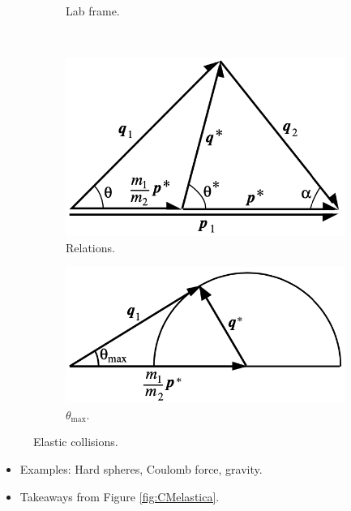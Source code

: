 \documentclass[../notes.tex]{subfiles}
\begin{document}
\begin{itemize}
\begin{figure}[h!]
\begin{subfigure}[b]{0.35\linewidth}
            \caption{Lab frame.}
            \label{fig:CMelasticb}
        \end{subfigure}\\[1em]
        \begin{subfigure}[b]{0.35\linewidth}
            \centering
            \includegraphics[width=0.9\linewidth]{../ExtFiles/CMelasticc.png}
            \caption{Relations.}
            \label{fig:CMelasticc}
        \end{subfigure}
        \begin{subfigure}[b]{0.35\linewidth}
            \centering
            \includegraphics[width=0.95\linewidth]{../ExtFiles/CMelasticd.png}
            \caption{$\theta_\text{max}$.}
            \label{fig:CMelasticd}
        \end{subfigure}
        \caption{Elastic collisions.}
        \label{fig:CMelastic}
    \end{figure}
    \begin{itemize}
        \item Examples: Hard spheres, Coulomb force, gravity.
        \item Takeaways from Figure \ref{fig:CMelastica}.
        \begin{itemize}

\end{itemize}
\end{itemize}
\end{itemize}
\end{document}
